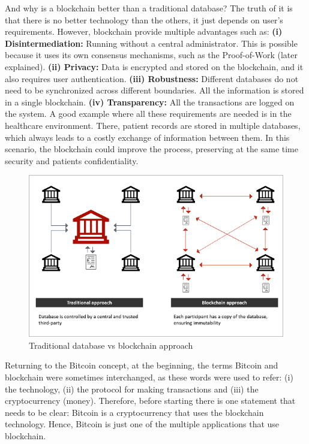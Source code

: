 And why is a blockchain better than a traditional database? The truth of it is that there is no better technology than the others, it just depends on user's requirements. However, blockchain provide multiple advantages such as: \newline
\textbf{(i) Disintermediation:} Running without a central administrator. This is possible because it uses its own consensus mechanisms, such as the Proof-of-Work (later explained). \newline
\textbf{(ii) Privacy:} Data is encrypted and stored on the blockchain, and it also requires user authentication. \newline
\textbf{(iii) Robustness:} Different databases do not need to be synchronized across different boundaries. All the information is stored in a single blockchain. \newline 
\textbf{(iv) Transparency:} All the transactions are logged on the system. \newline 
A good example where all these requirements are needed is in the healthcare environment. There, patient records are stored in multiple databases, which always leads to a costly exchange of information between them. In this scenario, the blockchain could improve the process, preserving at the same time security and patients confidentiality.


\begin{figure}
  \centering
  	\includegraphics[scale=0.8]{gfx/centralization_vs_decentralization.png}
  \caption{Traditional database vs blockchain approach}
  \label{fig:CentralizedvsDecentralized}
\end{figure}

Returning to the Bitcoin concept, at the beginning, the terms Bitcoin and blockchain were sometimes interchanged, as these words were used to refer: (i) the technology, (ii) the protocol for making transactions and (iii) the cryptocurrency (money). Therefore, before starting there is one statement that needs to be clear: Bitcoin is a cryptocurrency that uses the blockchain technology. Hence, Bitcoin is just one of the multiple applications that use blockchain. 

